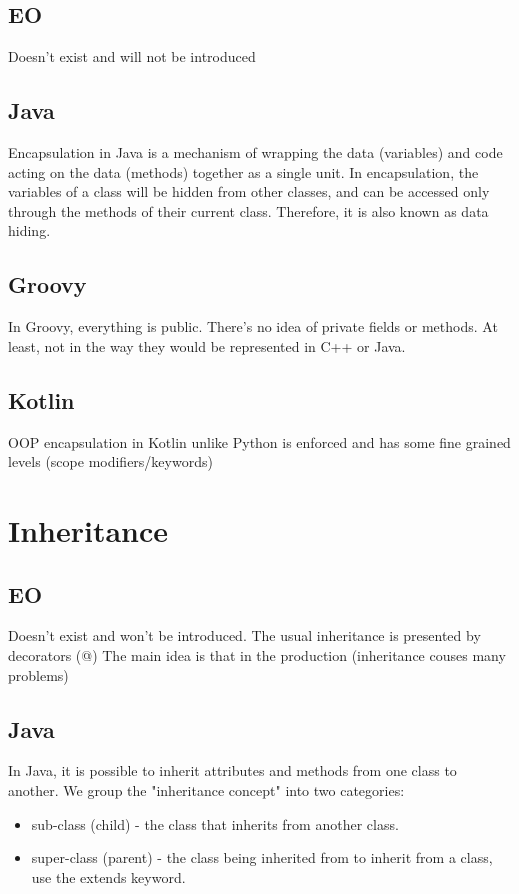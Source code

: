 \documentclass[12pt]{book}
\begin{document}
\subsection{EO}
Doesn't exist and will not be introduced

\subsection{Java}
Encapsulation in Java is a mechanism of wrapping 
the data (variables) and code acting on the 
data (methods) together as a single unit.
In encapsulation, the variables of a class will be
hidden from other classes, and can be accessed
only through the methods of their current class. 
Therefore, it is also known as data hiding.

\subsection{Groovy}
In Groovy, everything is public. There’s no idea 
of private fields or methods. At least, not in the way
they would be represented in C++ or Java.

\subsection{Kotlin}
OOP encapsulation in Kotlin unlike Python is enforced and has some fine grained levels (scope modifiers/keywords)

\section{Inheritance}

\subsection{EO}
Doesn't exist and won't be introduced.
The usual inheritance is presented by decorators (@)
The main idea is that in the production (inheritance couses 
many problems)

\subsection{Java}
In Java, it is possible to inherit attributes and methods from one class to another. We group the "inheritance concept" into two categories: 
\begin{itemize}
    \item sub-class (child) - the class that inherits from another class.
    \item super-class (parent) - the class being 
inherited from to inherit from a class, use the extends keyword.
\end{itemize}
\end{document}
